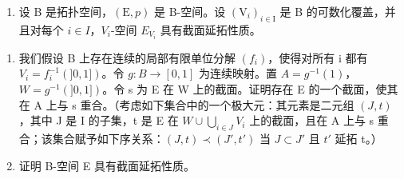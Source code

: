 \begin{enumerate}
\def\labelenumi{\arabic{enumi})}
\setcounter{enumi}{31}
\tightlist
\item
  设 B 是拓扑空间，\((\mathrm{E},p)\) 是 B-空间。设 \((\mathrm{V}_{i})_{i\in\mathrm{I}}\) 是 B 的可数化覆盖，并且对每个 \(i\in I\)，\(V_{i}\)-空间 \(E_{V_{i}}\) 具有截面延拓性质。
\end{enumerate}

\begin{enumerate}
\def\labelenumi{\alph{enumi})}
\item
  我们假设 B 上存在连续的局部有限单位分解 \((f_{i})\)，使得对所有 i 都有 \(V_{i} = f_{i}^{-1}(]0,1])\)。令 \(g: B \to [0,1]\) 为连续映射。置 \(A = g^{-1}(1)\)，\(W = g^{-1}(]0,1])\)。令 s 为 E 在 W 上的截面。证明存在 E 的一个截面，使其在 A 上与 s 重合。（考虑如下集合中的一个极大元：其元素是二元组 \((J,t)\)，其中 J 是 I 的子集，t 是 E 在 \(W \cup \bigcup_{i \in J} V_{i}\) 上的截面，且在 A 上与 s 重合；该集合赋予如下序关系：\((J,t) \prec (J',t')\) 当 \(J \subset J'\) 且 \(t'\) 延拓 t。）
\item
  证明 B-空间 E 具有截面延拓性质。
\end{enumerate}

